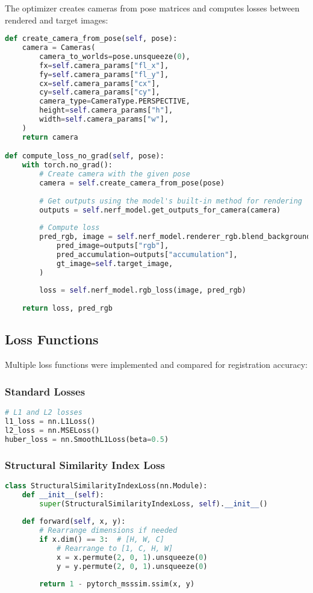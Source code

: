 The optimizer creates cameras from pose matrices and computes losses between rendered and target images:

\begin{lstlisting}[language=Python]
def create_camera_from_pose(self, pose):
    camera = Cameras(
        camera_to_worlds=pose.unsqueeze(0),
        fx=self.camera_params["fl_x"],
        fy=self.camera_params["fl_y"],
        cx=self.camera_params["cx"],
        cy=self.camera_params["cy"],
        camera_type=CameraType.PERSPECTIVE,
        height=self.camera_params["h"],
        width=self.camera_params["w"],
    )
    return camera

def compute_loss_no_grad(self, pose):
    with torch.no_grad():
        # Create camera with the given pose
        camera = self.create_camera_from_pose(pose)
        
        # Get outputs using the model's built-in method for rendering
        outputs = self.nerf_model.get_outputs_for_camera(camera)
        
        # Compute loss
        pred_rgb, image = self.nerf_model.renderer_rgb.blend_background_for_loss_computation(
            pred_image=outputs["rgb"],
            pred_accumulation=outputs["accumulation"],
            gt_image=self.target_image,
        )
        
        loss = self.nerf_model.rgb_loss(image, pred_rgb)
        
    return loss, pred_rgb
\end{lstlisting}

\subsection{Loss Functions}

Multiple loss functions were implemented and compared for registration accuracy:

\subsubsection{Standard Losses}
\begin{lstlisting}[language=Python]
# L1 and L2 losses
l1_loss = nn.L1Loss()
l2_loss = nn.MSELoss()
huber_loss = nn.SmoothL1Loss(beta=0.5)
\end{lstlisting}

\subsubsection{Structural Similarity Index Loss}
\begin{lstlisting}[language=Python]
class StructuralSimilarityIndexLoss(nn.Module):
    def __init__(self):
        super(StructuralSimilarityIndexLoss, self).__init__()
    
    def forward(self, x, y):
        # Rearrange dimensions if needed
        if x.dim() == 3:  # [H, W, C]
            # Rearrange to [1, C, H, W]
            x = x.permute(2, 0, 1).unsqueeze(0)
            y = y.permute(2, 0, 1).unsqueeze(0)
        
        return 1 - pytorch_msssim.ssim(x, y)
\end{lstlisting}


